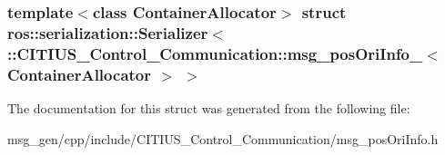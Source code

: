 \subsubsection*{template$<$class Container\-Allocator$>$ struct ros\-::serialization\-::\-Serializer$<$ \-::\-C\-I\-T\-I\-U\-S\-\_\-\-Control\-\_\-\-Communication\-::msg\-\_\-pos\-Ori\-Info\-\_\-$<$ Container\-Allocator $>$ $>$}



\-The documentation for this struct was generated from the following file\-:\begin{DoxyCompactItemize}
\item 
msg\-\_\-gen/cpp/include/\-C\-I\-T\-I\-U\-S\-\_\-\-Control\-\_\-\-Communication/msg\-\_\-pos\-Ori\-Info.\-h\end{DoxyCompactItemize}
